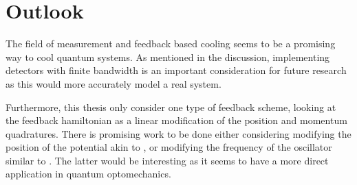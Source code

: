 \section{Outlook}
The field of measurement and feedback based cooling seems to be a promising way to cool quantum systems. As mentioned in the discussion, implementing detectors with finite bandwidth is an important consideration for future research as this would more accurately model a real system. 

Furthermore, this thesis only consider one type of feedback scheme, looking at the feedback hamiltonian as a linear modification of the position and momentum quadratures. There is promising work to be done either considering modifying the position of the potential akin to \cite{De-Sousa:2025}, or modifying the frequency of the oscillator similar to \cite{Habibi:2016}. The latter would be interesting as it seems to have a more direct application in quantum optomechanics.